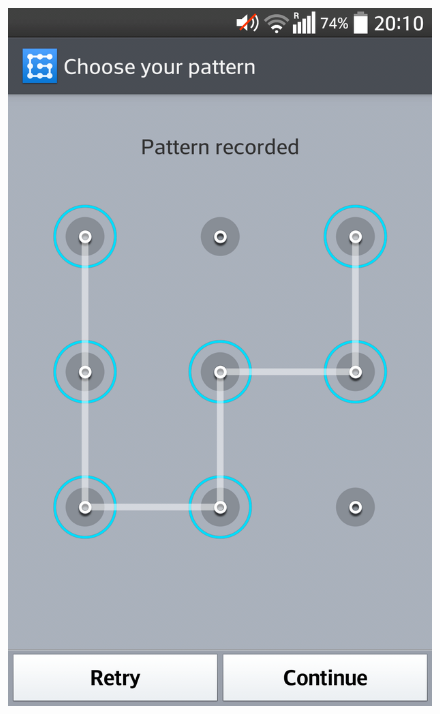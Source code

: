 \begin{figure}[H]
{        \includegraphics[scale=0.08]{pics/experiment/patternprocess4.png}
        \label{fig:patternrecorded}
      }\\
\end{figure}
